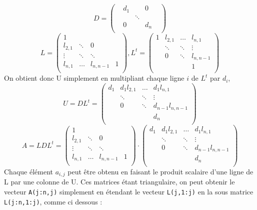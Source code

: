 \documentclass{article}
\begin{document}
\[
	D = 
	\begin{pmatrix}
	&d_1	& 		& 0&	\\
	&		& \ddots& &		\\
	& 0	& 		& d_n & 	\\
	\end{pmatrix}
\]
\[	
	L = 
	\begin{pmatrix}
	1		& 	& 	&  	\\
	l_{2,1}	& \ddots&0& 	\\
	\vdots	& \ddots & \ddots&  \\
	l_{n,1}	& \dots  & l_{n,n-1} & 1 	\\
	\end{pmatrix}, 
	L^t = 
	\begin{pmatrix}
	1		& l_{2,1}& \dots	& l_{n,1} 	\\
			& \ddots&\ddots& \vdots	\\
			& 0 & \ddots& l_{n,n-1} \\
			&  && 1 	\\
	\end{pmatrix}
\]
On obtient donc U simplement en multipliant chaque ligne \(i\) de \(L^t\) par \(d_i\),
\[
	U = DL^t = 
	\begin{pmatrix}
	d_1		& d_1 l_{2,1}& \dots	& d_1 l_{n,1} 	\\
			& \ddots&\ddots& \vdots	\\
			& 0 & \ddots& d_{n-1} l_{n,n-1} \\
			&  && d_n 	\\
	\end{pmatrix}
\]
\[	
	A = LDL^t = 
	\begin{pmatrix}
	1		& 	& 	&  	\\
	l_{2,1}	& \ddots&0& 	\\
	\vdots	& \ddots & \ddots&  \\
	l_{n,1}	& \dots  & l_{n,n-1} & 1 	\\
	\end{pmatrix}\cdot
	\begin{pmatrix}
	d_1		& d_1 l_{2,1}& \dots	& d_1 l_{n,1} 	\\
			& \ddots&\ddots& \vdots	\\
			& 0 & \ddots& d_{n-1} l_{n,n-1} \\
			&  && d_n 	\\
	\end{pmatrix}
\]
Chaque élément \(a_{i,j}\) peut être obtenu en faisant le produit scalaire d'une ligne de L par une colonne de U. Ces matrices étant triangulaire, on peut obtenir le vecteur \texttt{A(j:n,j)} simplement en étendant le vecteur \texttt{L(j,1:j)} en la sous matrice \texttt{L(j:n,1:j)}, comme ci dessous :
\end{document}
